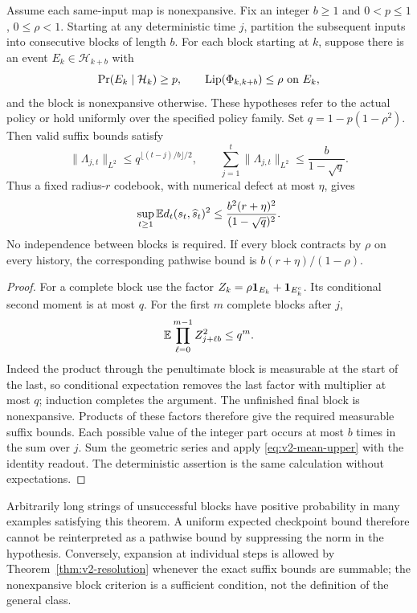 \begin{theorem}\label{thm:v2-blocks}
Assume each same-input map is nonexpansive. Fix an integer $b\ge1$ and
$0<p\le1$, $0\le\rho<1$. Starting at any deterministic time $j$, partition
the subsequent inputs into consecutive blocks of length $b$. For each
block starting at $k$, suppose there is an event $E_k\in\mathcal H_{k+b}$
with
\[
 \Pr(E_k\mid\mathcal H_k)\ge p,
 \qquad \operatorname{Lip}(\Phi_{k,k+b})\le\rho\ \text{on }E_k,
\]
and the block is nonexpansive otherwise. These hypotheses refer to the
actual policy or hold uniformly over the specified policy family.
Set $q=1-p(1-\rho^2)$. Then valid suffix bounds satisfy
\[
 \|\Lambda_{j,t}\|_{L^2}
 \le q^{\lfloor(t-j)/b\rfloor/2},\qquad
 \sum_{j=1}^t\|\Lambda_{j,t}\|_{L^2}
 \le\frac{b}{1-\sqrt q}.
\]
Thus a fixed radius-$r$ codebook, with numerical defect at most $\eta$,
gives
\[
 \sup_{t\ge1}\mathbb E d_t(s_t,\widehat s_t)^2
 \le\frac{b^2(r+\eta)^2}{(1-\sqrt q)^2}.
\]
No independence between blocks is required. If every block contracts by
$\rho$ on every history, the corresponding pathwise bound is
$b(r+\eta)/(1-\rho)$.
\end{theorem}
\begin{proof}
For a complete block use the factor
$Z_k=\rho\mathbf 1_{E_k}+\mathbf 1_{E_k^c}$. Its conditional second moment is at
most $q$. For the first $m$ complete blocks after $j$,
\[
 \mathbb E\prod_{\ell=0}^{m-1}Z_{j+\ell b}^2\le q^m.
\]
Indeed the product through the penultimate block is measurable at the
start of the last, so conditional expectation removes the last factor
with multiplier at most $q$; induction completes the argument. The
unfinished final block is nonexpansive. Products of these factors
therefore give the required measurable suffix bounds. Each possible
value of the integer part occurs at most $b$ times in the sum over $j$.
Sum the geometric series and apply \eqref{eq:v2-mean-upper} with the
identity readout. The deterministic assertion is the same calculation
without expectations.
\end{proof}

Arbitrarily long strings of unsuccessful blocks have positive probability
in many examples satisfying this theorem. A uniform expected checkpoint
bound therefore cannot be reinterpreted as a pathwise bound by suppressing
the norm in the hypothesis. Conversely, expansion at individual steps is
allowed by Theorem~\ref{thm:v2-resolution} whenever the exact suffix bounds
are summable; the nonexpansive block criterion is a sufficient condition,
not the definition of the general class.

